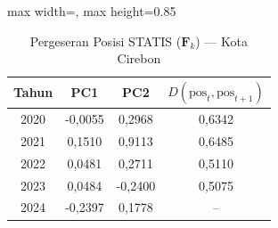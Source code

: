 \begin{table}[H]
\centering
\caption{Pergeseran Posisi STATIS ($\mathbf{F}_k$) --- Kota Cirebon} \label{tab:app1jarak_statis_skor_kota_cirebon}
\begin{adjustbox}{max width=\textwidth, max height=0.85\textheight}
\begin{tabular}{|c|c|c|c|}
\hline
\textbf{Tahun} & \textbf{PC1} & \textbf{PC2} & \textbf{$D(\text{pos}_t, \text{pos}_{t+1})$} \\
\hline
2020 & -0,0055 & 0,2968 & 0,6342 \\
2021 & 0,1510 & 0,9113 & 0,6485 \\
2022 & 0,0481 & 0,2711 & 0,5110 \\
2023 & 0,0484 & -0,2400 & 0,5075 \\
2024 & -0,2397 & 0,1778 & -- \\
\hline
\end{tabular}
\end{adjustbox}
\end{table}
